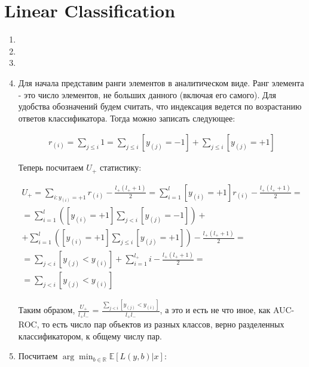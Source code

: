 \documentclass{article}
\begin{document}
\section{Linear Classification}

\begin{enumerate}
    \item 
    \item
    \item
    \item Для начала представим ранги элементов в аналитическом виде. Ранг элемента - это число элементов, не больших данного (включая его самого).
    Для удобства обозначений будем считать, что индексация ведется по возрастанию ответов классификатора. Тогда можно записать следующее:

    \small
    \begin{gather*}
        r_{(i)} = \sum_{j \le i} 1 = \sum_{j \le i} \left[ y_{(j)} = -1 \right] + \sum_{j \le i} \left[ y_{(j)} = +1 \right]
    \end{gather*}
    \normalsize
    
    Теперь посчитаем $ U_+ $ статистику:

    \small
    \begin{gather*}
        U_+ = \sum_{i : y_{(i)} = +1} r_{(i)} - \frac{l_+(l_+ + 1)}{2} = 
        \sum_{i=1}^l \left[ y_{(i)} = +1 \right] r_{(i)} - \frac{l_+(l_+ + 1)}{2} = \\
        = \sum_{i=1}^l \left( \left[ y_{(i)} = +1 \right] \sum_{j < i} \left[ y_{(j)} = -1 \right] \right) + \\
        + \sum_{i=1}^l \left( \left[ y_{(i)} = +1 \right] \sum_{j \le i} \left[ y_{(j)} = +1 \right] \right) - \frac{l_+(l_+ + 1)}{2} = \\
        = \sum_{j < i} \left[ y_{(j)} < y_{(i)} \right] + \sum_{i = 1}^{l_+} i - \frac{l_+(l_+ + 1)}{2} = \\
        = \sum_{j < i} \left[ y_{(j)} < y_{(i)} \right]
    \end{gather*}
    \normalsize
    
    Таким образом, $ \frac{U_+}{l_+ l_- } $ = $ \frac{\sum_{j < i} \left[ y_{(j)} < y_{(i)} \right]}{l_+ l_-} $, а это и есть не что иное, как AUC-ROC,
    то есть число пар объектов из разных классов, верно разделенных классификатором, к общему числу пар.
    
    \item Посчитаем $ \arg \min_{b \in \mathbb{R}} \mathbb{E} \left[ L(y, b) | x \right]$:


\end{enumerate}
\end{document}
